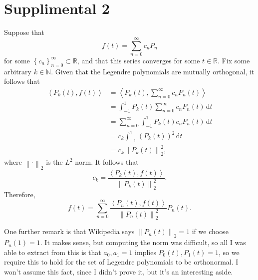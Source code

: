 \documentclass[11pt, letterpaper]{report}
\begin{document}
\section*{Supplimental 2}
Suppose that
\[
	f(t)=\sum_{n=0}^{\infty} c_nP_n
\]
for some $\left\{ c_n \right\}_{n=0}^\infty \subset \mathbb{R}$, and that this series converges for some $t\in\mathbb{R}$. Fix some arbitrary $k\in\mathbb{N}$. Given that the Legendre polynomials are mutually orthogonal, it follows that
\begin{align*}
	\left\langle P_k(t),f(t) \right\rangle &=\left\langle P_k(t),\sum_{n=0}^{\infty} c_nP_n(t) \right\rangle \\
					       &=\int_{-1}^{1} P_k(t)\sum_{n=0}^{\infty} c_nP_n(t) \,\mathrm{d} t\\
					       &=\sum_{n=0}^{\infty} \int_{-1}^{1} P_k(t)c_nP_n(t) \,\mathrm{d} t\\
					       &=c_k\int_{-1}^{1} \left( P_k(t) \right) ^2 \,\mathrm{d} t\\
					       &=c_k\left\lVert P_k(t) \right\rVert_2^2
,\end{align*}
where $\left\lVert \cdot  \right\rVert_2$ is the $L^2$ norm. It follows that
\[
	c_k=\frac{\left\langle P_k(t),f(t) \right\rangle }{\left\lVert P_k(t) \right\rVert_2^2}
.\]
Therefore,
\[
	f(t)=\sum_{n=0}^{\infty} \frac{\left\langle P_n(t),f(t) \right\rangle }{\left\lVert P_n(t) \right\rVert_2^2}P_n(t)
.\]

One further remark is that Wikipedia says $\left\lVert P_n(t) \right\rVert_2=1$ if we choose $P_n(1)=1$. It makes sense, but computing the norm was difficult, so all I was able to extract from this is that $a_0,a_1=1$ implies $P_0(t),P_1(t)=1$, so we require this to hold for the set of Legendre polynomials to be orthonormal. I won't assume this fact, since I didn't prove it, but it's an interesting aside.
\end{document}

